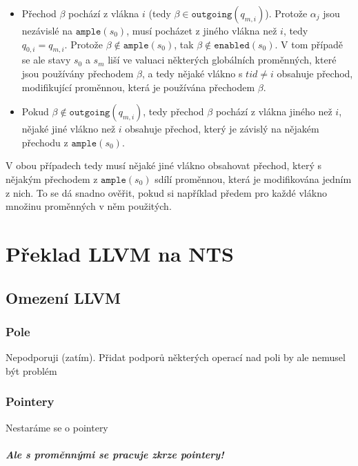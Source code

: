 \documentclass[10pt,a4paper,notitlepage]{report}
\begin{document}
\begin{itemize}
\item Přechod $\beta$ pochází z vlákna $i$ (tedy $\beta \in \texttt{outgoing}(q_{m,i})$).  Protože $\alpha_j$ jsou nezávislé na $\texttt{ample}(s_0)$, musí pocházet z jiného vlákna než $i$, tedy $q_{0,i} = q_{m,i}$. Protože $\beta \not \in \texttt{ample}(s_0)$, tak $\beta \not \in \texttt{enabled}(s_0)$. V tom případě se ale stavy $s_0$ a $s_m$ liší ve valuaci některých globálních proměnných, které jsou používány přechodem $\beta$, a tedy nějaké vlákno s $tid \neq i$ obsahuje přechod, modifikující proměnnou, která je používána přechodem $\beta$.

\item Pokud $\beta \not \in \texttt{outgoing}(q_{m,i})$, tedy přechod $\beta$ pochází z vlákna jiného než $i$, nějaké jiné vlákno než $i$ obsahuje přechod, který je závislý na nějakém přechodu z $\texttt{ample}(s_0)$. 
\end{itemize}

V obou případech tedy musí nějaké jiné vlákno obsahovat přechod, který s nějakým přechodem z $\texttt{ample}(s_0)$ sdílí proměnnou, která je modifikována jedním z nich. To se dá snadno ověřit, pokud si například předem pro každé vlákno množinu proměnných v něm použitých.



\chapter{Překlad LLVM na NTS}
\section{Omezení LLVM}

\subsection{Pole}
Nepodporuji (zatím). Přidat podporů některých operací nad poli by ale nemusel být problém
\subsection{Pointery}
Nestaráme se o pointery
\paragraph{Ale s proměnnými se pracuje zkrze pointery!}
\end{document}
